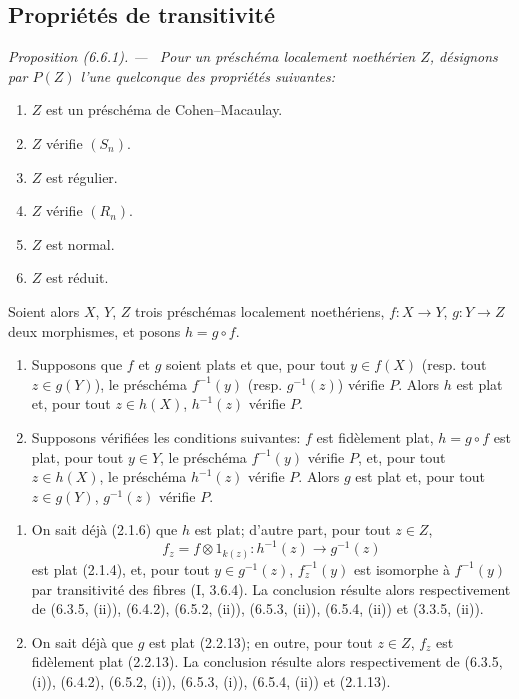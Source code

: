 \documentclass[10pt,oneside]{book}
\newcommand{\oldpage}[2][]{%
  \setcounter{footnote}{0}%
  \marginpar{\scriptsize\textbf{#1}~|~#2}\ignorespaces}
\newenvironment{proposition}[1][]{%
  \par\medskip\noindent\itshape Proposition (#1). ---\ }{\par}
\begin{document}
\oldpage[IV-2]{145}

\subsection{Propriétés de transitivité}

\begin{proposition}[6.6.1]
\label{IV.2.s6.6.1-fr}
Pour un préschéma localement noethérien $Z$, désignons par $P(Z)$ l'une
quelconque des propriétés suivantes:
\begin{enumerate}
\item[(a)] $Z$ est un préschéma de Cohen--Macaulay.
\item[(b)] $Z$ vérifie $(S_n)$.
\item[(c)] $Z$ est régulier.
\item[(d)] $Z$ vérifie $(R_n)$.
\item[(e)] $Z$ est normal.
\item[(f)] $Z$ est réduit.
\end{enumerate}
Soient alors $X$, $Y$, $Z$ trois préschémas localement noethériens,
$f:X\to Y$, $g:Y\to Z$ deux morphismes, et posons $h=g\circ f$.
\begin{enumerate}
\item[(i)] Supposons que $f$ et $g$ soient plats et que, pour tout
$y\in f(X)$ (resp. tout $z\in g(Y)$), le préschéma $f^{-1}(y)$
(resp. $g^{-1}(z)$) vérifie $P$. Alors $h$ est plat et, pour tout
$z\in h(X)$, $h^{-1}(z)$ vérifie $P$.
\item[(ii)] Supposons vérifiées les conditions suivantes: $f$ est
fidèlement plat, $h=g\circ f$ est plat, pour tout $y\in Y$, le
préschéma $f^{-1}(y)$ vérifie $P$, et, pour tout $z\in h(X)$, le
préschéma $h^{-1}(z)$ vérifie $P$. Alors $g$ est plat et, pour tout
$z\in g(Y)$, $g^{-1}(z)$ vérifie $P$.
\end{enumerate}
\begin{enumerate}
\item[(i)] On sait déjà (2.1.6) que $h$ est plat; d'autre part, pour
      tout $z\in Z$,
\[
 f_z=f\otimes 1_{k(z)}:h^{-1}(z)\longrightarrow g^{-1}(z)
\]
est plat (2.1.4), et, pour tout $y\in g^{-1}(z)$, $f_z^{-1}(y)$ est
isomorphe à $f^{-1}(y)$ par transitivité des fibres (I, 3.6.4). La
conclusion résulte alors respectivement de (6.3.5, (ii)), (6.4.2),
(6.5.2, (ii)), (6.5.3, (ii)), (6.5.4, (ii)) et (3.3.5, (ii)).
\item[(ii)] On sait déjà que $g$ est plat (2.2.13); en outre, pour
      tout $z\in Z$, $f_z$ est fidèlement plat (2.2.13). La conclusion
      résulte alors respectivement de (6.3.5, (i)), (6.4.2),
(6.5.2, (i)), (6.5.3, (i)), (6.5.4, (ii)) et (2.1.13).
\end{enumerate}
\end{proposition}
\end{document}
